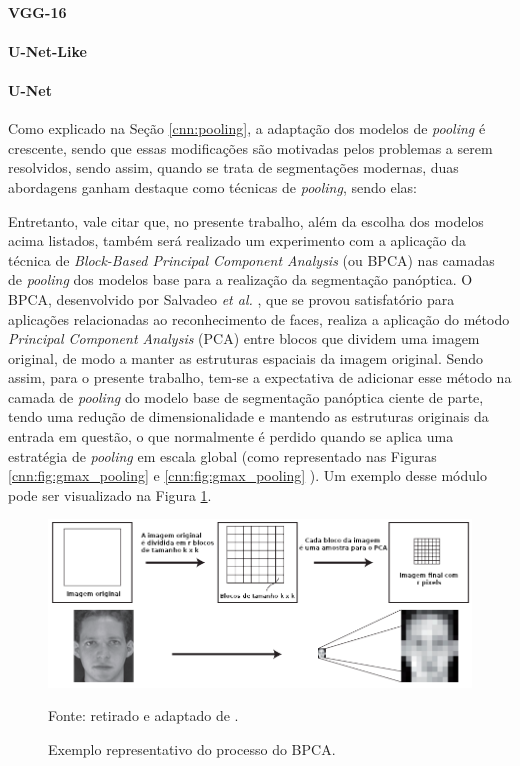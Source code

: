 \paragraph{VGG-16}

\paragraph{U-Net-Like}

\paragraph{U-Net}

Como explicado na Seção \ref{cnn:pooling}, a adaptação dos modelos de \textit{pooling} é crescente, sendo que essas modificações são motivadas pelos problemas a serem resolvidos, sendo assim, quando se trata de segmentações modernas, duas abordagens ganham destaque como técnicas de \textit{pooling}, sendo elas:

Entretanto, vale citar que, no presente trabalho, além da escolha dos modelos acima listados, também será realizado um experimento com a aplicação da técnica de \textit{Block-Based Principal Component Analysis} (ou BPCA) nas camadas de \textit{pooling} dos modelos base para a realização da segmentação panóptica. O BPCA, desenvolvido por Salvadeo \textit{et al.} \cite{Salvadeo2011}, que se provou satisfatório para aplicações relacionadas ao reconhecimento de faces, realiza a aplicação do método \textit{Principal Component Analysis} (PCA) entre blocos que dividem uma imagem original, de modo a manter as estruturas espaciais da imagem original. Sendo assim, para o presente trabalho, tem-se a expectativa de adicionar esse método na camada de \textit{pooling} do modelo base  de segmentação panóptica ciente de parte, tendo uma redução de dimensionalidade e mantendo as estruturas originais da entrada em questão, o que normalmente é perdido quando se aplica uma estratégia de \textit{pooling} em escala global (como representado nas Figuras \ref{cnn:fig:gmax_pooling} e \ref{cnn:fig:gmax_pooling} ).  Um exemplo desse módulo pode ser visualizado na Figura \ref{project:pcapooling:fig:3}.

\begin{figure}[H]
    \centering
    \caption{Exemplo representativo do processo do BPCA.}
    \includegraphics[width=1\textwidth]{recursos/imagens/project/BPCA.png}
    \label{project:pcapooling:fig:3}

    Fonte: retirado e adaptado de \cite{Salvadeo2011}.
\end{figure}

